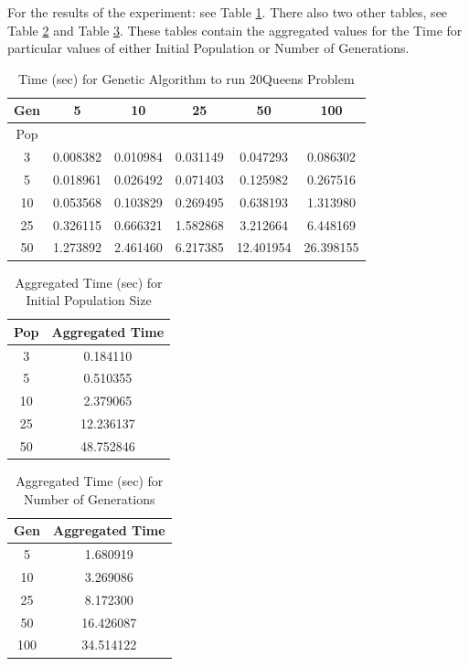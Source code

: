 \documentclass[11pt]{article}
\begin{document}
For the results of the experiment: see Table \ref{tab:pd}. There also two other tables, see Table \ref{tab:pd_1} and Table \ref{tab:pd_2}.
These tables contain the aggregated values for the Time for particular values of either Initial Population or Number of Generations.

\begin{table}
\centering
\caption{Time (sec) for Genetic Algorithm to run 20Queens Problem}
\begin{tabular}{|c||| c | c | c | c | c |} %
\hline %
Gen &       5   &       10  &       25  &        50  &        100 \\
   \hline
Pop &           &           &           &            &            \\
   \hline \hline
3   &  0.008382 &  0.010984 &  0.031149 &   0.047293 &   0.086302 \\
   \hline
5   &  0.018961 &  0.026492 &  0.071403 &   0.125982 &   0.267516 \\
   \hline
10  &  0.053568 &  0.103829 &  0.269495 &   0.638193 &   1.313980 \\
   \hline
25  &  0.326115 &  0.666321 &  1.582868 &   3.212664 &   6.448169 \\
   \hline
50  &  1.273892 &  2.461460 &  6.217385 &  12.401954 &  26.398155 \\
   \hline \hline

   \end{tabular}
\label{tab:pd} 
\end{table}


\begin{table}
\centering
\caption{Aggregated Time (sec) for Initial Population Size}
\begin{tabular}{| c || c |} %
\hline %
 Pop &  Aggregated Time \\
   \hline \hline
3   &   0.184110 \\
\hline
5   &   0.510355 \\
\hline
10  &   2.379065 \\
\hline
25  &  12.236137 \\
\hline
50  &  48.752846 \\
\hline
   \end{tabular}
\label{tab:pd_1} 
\end{table}


\begin{table}
\centering
\caption{Aggregated Time (sec) for Number of Generations}
\begin{tabular}{| c || c |} %
\hline %
 Gen &  Aggregated Time \\
   \hline \hline
5   &   1.680919 \\
\hline
10  &   3.269086 \\
\hline
25  &   8.172300 \\
\hline
50  &  16.426087 \\
\hline
100 &  34.514122 \\
\hline
   \end{tabular}
\label{tab:pd_2} 
\end{table}
\end{document}

